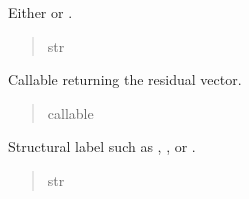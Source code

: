 \documentclass[letterpaper,10pt,english,openany,oneside]{sphinxmanual}
\begin{document}
\begin{fulllineitems}
\begin{fulllineitems}
\begin{quote}
\begin{description}
\end{description}\end{quote}

\end{fulllineitems}



\begin{fulllineitems}

\pysigstartsignatures
{}
\pysigstopsignatures
\sphinxAtStartPar
Either  or .
\begin{quote}\begin{description}
\sphinxAtStartPar
str

\end{description}\end{quote}

\end{fulllineitems}



\begin{fulllineitems}

\pysigstartsignatures
{}
\pysigstopsignatures
\sphinxAtStartPar
Callable returning the residual vector.
\begin{quote}\begin{description}
\sphinxAtStartPar
callable

\end{description}\end{quote}

\end{fulllineitems}



\begin{fulllineitems}

\pysigstartsignatures
{}
\pysigstopsignatures
\sphinxAtStartPar
Structural label such as , , or .
\begin{quote}\begin{description}
\sphinxAtStartPar
str

\end{description}\end{quote}

\end{fulllineitems}




\end{fulllineitems}
\end{document}
